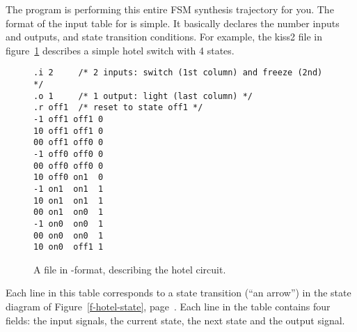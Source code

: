 The program  
is performing this entire FSM synthesis trajectory
for you. The format of the input table for  is simple. It basically
declares the number inputs and outputs, and state transition conditions. For
example, the kiss2 file in figure~\ref{tut-kiss2} describes a simple hotel 
switch with 4 states.
\begin{figure}
{\small
\begin{verbatim}
.i 2     /* 2 inputs: switch (1st column) and freeze (2nd) */
.o 1     /* 1 output: light (last column) */
.r off1  /* reset to state off1 */
-1 off1 off1 0
10 off1 off1 0
00 off1 off0 0
-1 off0 off0 0
00 off0 off0 0
10 off0 on1  0
-1 on1  on1  1
10 on1  on1  1
00 on1  on0  1
-1 on0  on0  1
00 on0  on0  1
10 on0  off1 1
\end{verbatim}
}
\caption{
A file in \protect{}-format, describing the hotel circuit.}
\label{tut-kiss2}
\end{figure}
Each line in this table corresponds to a state transition (``an arrow'') in the
state diagram of Figure~\ref{f-hotel-state}, page~\pageref{f-hotel-state}.
Each line in the table contains four fields: the input signals, the current
state, the next state and the output signal.


